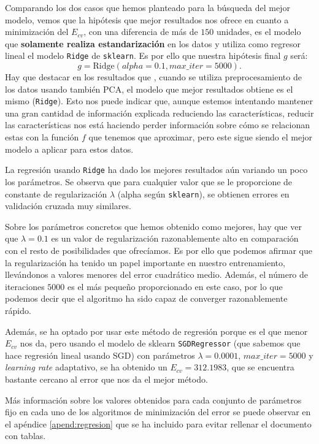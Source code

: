 \documentclass[a4paper, 20pt]{article}
\begin{document}
Comparando los dos casos que hemos planteado para la búsqueda del mejor modelo, vemos que la hipótesis que mejor resultados nos ofrece en cuanto a minimización del $E_{cv}$, con una diferencia de más de $150$ unidades, es el modelo que \textbf{solamente realiza estandarización} en los datos y utiliza como regresor lineal el modelo \lstinline{Ridge} de \lstinline{sklearn}. Es por ello que nuestra hipótesis final $g$ será:
$$
g = \text{Ridge}(alpha = 0.1, max\_iter = 5000).
$$
Hay que destacar en los resultados que , cuando se utiliza preprocesamiento de los datos usando también PCA, el modelo que mejor resultados obtiene es el mismo (\lstinline{Ridge}). Esto nos puede indicar que, aunque estemos intentando mantener una gran cantidad de información explicada reduciendo las características, reducir las características nos está haciendo perder información sobre cómo se relacionan estas con la función $f$ que tenemos que aproximar, pero este sigue siendo el mejor modelo a aplicar para estos datos.

La regresión usando \lstinline{Ridge} ha dado los mejores resultados aún variando un poco los parámetros. Se observa que para cualquier valor que se le proporcione de constante de regularización $\lambda$ (alpha según \lstinline{sklearn}), se obtienen errores en validación cruzada muy similares. 

Sobre los parámetros concretos que hemos obtenido como mejores, hay que ver que $\lambda = 0.1$ es un valor de regularización razonablemente alto en comparación con el resto de posibilidades que ofrecíamos. Es por ello que podemos afirmar que la regularización ha tenido un papel importante en nuestro entrenamiento, llevándonos a valores menores del error cuadrático medio. Además, el número de iteraciones $5000$ es el más pequeño proporcionado en este caso, por lo que podemos decir que el algoritmo ha sido capaz de converger razonablemente rápido.

Además, se ha optado por usar este método de regresión porque es el que menor $E_{cv}$ nos da, pero usando el modelo de sklearn \lstinline{SGDRegressor} (que sabemos que hace regresión lineal usando SGD) con parámetros $\lambda = 0.0001$, $max\_iter = 5000$ y \emph{learning rate} adaptativo, se ha obtenido un $E_{cv} = 312.1983$, que se encuentra bastante cercano al error que nos da el mejor método.

Más información sobre los valores obtenidos para cada conjunto de parámetros fijo en cada uno de los algoritmos de minimización del error se puede observar en el apéndice \ref{apend:regresion} que se ha incluido para evitar rellenar el documento con tablas.
\end{document}
